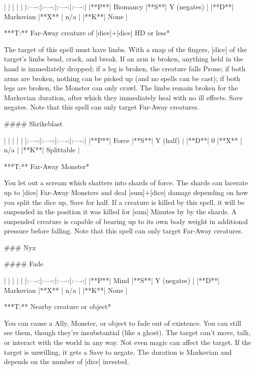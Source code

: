 | | | | |
|:----:|:----:|:----:|:----:|
|**P**| Biomancy |**S**|  Y (negates) |
|**D**| Markovian |**X** |  n/a  |
|**K**| None |


***T:**   Far-Away creature of [dice]+[dice] HD or less*



The target of this spell must have limbs.  With a snap of the fingers, [dice] of the target's limbs bend, crack, and break.  If an arm is broken, anything held in the hand is immediately dropped; if a leg is broken, the creature falls Prone; if both arms are broken, nothing can be picked up (and no spells can be cast); if both legs are broken, the Monster can only crawl.  The limbs remain broken for the Markovian duration, after which they immediately heal with no ill effects. Save negates.  Note that this spell can only target Far-Away creatures.






#### Shrikeblast

| | | | |
|:----:|:----:|:----:|:----:|
|**P**| Force |**S**|  Y (half) |
|**D**| 0 |**X** |  n/a  |
|**K**| Splittable |


***T:**   Far-Away Monster*



You let out a scream which shatters into shards of force.  The shards can lacerate up to [dice]  Far-Away Monsters and deal [sum]+[dice] damage depending on how you split the dice up, Save for half. If a creature is killed by this spell, it will be suspended in the position it was killed for [sum] Minutes by by the shards. A suspended creature is capable of bearing up to its own body weight in additional pressure before falling.  Note that this spell can only target Far-Away creatures.


### Nyx





#### Fade

| | | | |
|:----:|:----:|:----:|:----:|
|**P**| Mind |**S**|  Y (negates) |
|**D**| Markovian |**X** |  n/a  |
|**K**| None |


***T:**   Nearby creature or object*



You can cause a Ally, Monster, or object to fade out of existence.  You can still see them, though they're insubstantial (like a ghost).  The target can't move, talk, or interact with the world in any way.  Not even magic can affect the target.  If the target is unwilling, it gets a Save to negate.  The duration is Markovian and depends on the number of [dice] invested.



